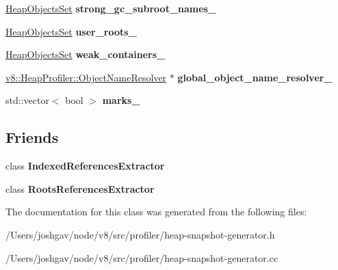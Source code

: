 \begin{DoxyCompactItemize}
\item 
\hyperlink{classv8_1_1internal_1_1_heap_objects_set}{Heap\+Objects\+Set} {\bfseries strong\+\_\+gc\+\_\+subroot\+\_\+names\+\_\+}\hypertarget{classv8_1_1internal_1_1_v8_heap_explorer_afe1da845089eceb0d9f9eecfc8b06385}{}\label{classv8_1_1internal_1_1_v8_heap_explorer_afe1da845089eceb0d9f9eecfc8b06385}

\item 
\hyperlink{classv8_1_1internal_1_1_heap_objects_set}{Heap\+Objects\+Set} {\bfseries user\+\_\+roots\+\_\+}\hypertarget{classv8_1_1internal_1_1_v8_heap_explorer_ad1bee0e70956344260fc0926e84d220a}{}\label{classv8_1_1internal_1_1_v8_heap_explorer_ad1bee0e70956344260fc0926e84d220a}

\item 
\hyperlink{classv8_1_1internal_1_1_heap_objects_set}{Heap\+Objects\+Set} {\bfseries weak\+\_\+containers\+\_\+}\hypertarget{classv8_1_1internal_1_1_v8_heap_explorer_a34a92ab58d50e2b1edd2238bc68a5811}{}\label{classv8_1_1internal_1_1_v8_heap_explorer_a34a92ab58d50e2b1edd2238bc68a5811}

\item 
\hyperlink{classv8_1_1_heap_profiler_1_1_object_name_resolver}{v8\+::\+Heap\+Profiler\+::\+Object\+Name\+Resolver} $\ast$ {\bfseries global\+\_\+object\+\_\+name\+\_\+resolver\+\_\+}\hypertarget{classv8_1_1internal_1_1_v8_heap_explorer_a860316054bf1704d3204c2342dfb49f7}{}\label{classv8_1_1internal_1_1_v8_heap_explorer_a860316054bf1704d3204c2342dfb49f7}

\item 
std\+::vector$<$ bool $>$ {\bfseries marks\+\_\+}\hypertarget{classv8_1_1internal_1_1_v8_heap_explorer_a53becbb8b5c9157a9825590ffd3a5674}{}\label{classv8_1_1internal_1_1_v8_heap_explorer_a53becbb8b5c9157a9825590ffd3a5674}

\end{DoxyCompactItemize}
\subsection*{Friends}
\begin{DoxyCompactItemize}
\item 
class {\bfseries Indexed\+References\+Extractor}\hypertarget{classv8_1_1internal_1_1_v8_heap_explorer_a6ef0d133911e40c06746778027023e0a}{}\label{classv8_1_1internal_1_1_v8_heap_explorer_a6ef0d133911e40c06746778027023e0a}

\item 
class {\bfseries Roots\+References\+Extractor}\hypertarget{classv8_1_1internal_1_1_v8_heap_explorer_a07c650327bd63061c049a9ae184a0ba6}{}\label{classv8_1_1internal_1_1_v8_heap_explorer_a07c650327bd63061c049a9ae184a0ba6}

\end{DoxyCompactItemize}


The documentation for this class was generated from the following files\+:\begin{DoxyCompactItemize}
\item 
/\+Users/joshgav/node/v8/src/profiler/heap-\/snapshot-\/generator.\+h\item 
/\+Users/joshgav/node/v8/src/profiler/heap-\/snapshot-\/generator.\+cc\end{DoxyCompactItemize}
